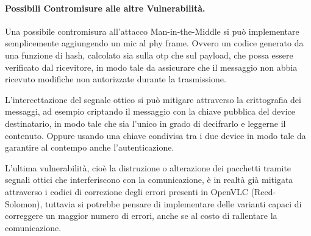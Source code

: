 \paragraph{Possibili Contromisure alle altre Vulnerabilità.}
Una possibile contromisura all'attacco Man-in-the-Middle si può implementare semplicemente aggiungendo un \gls{mic} al \gls{phy} frame. Ovvero un codice generato da una funzione di hash, calcolato sia sulla \gls{otp} che sul payload, che possa essere verificato dal ricevitore, in modo tale da assicurare che il messaggio non abbia ricevuto modifiche non autorizzate durante la trasmissione.

L'intercettazione del segnale ottico si può mitigare attraverso la crittografia dei messaggi, ad esempio criptando il messaggio con la chiave pubblica del device destinatario, in modo tale che sia l'unico in grado di decifrarlo e leggerne il contenuto. Oppure usando una chiave condivisa tra i due device in modo tale da garantire al contempo anche l'autenticazione.

L'ultima vulnerabilità, cioè la distruzione o alterazione dei pacchetti tramite segnali ottici che interferiscono con la comunicazione, è in realtà già mitigata attraverso i codici di correzione degli errori presenti in OpenVLC (Reed-Solomon), tuttavia si potrebbe pensare di implementare delle varianti capaci di correggere un maggior numero di errori, anche se al costo di rallentare la comunicazione.